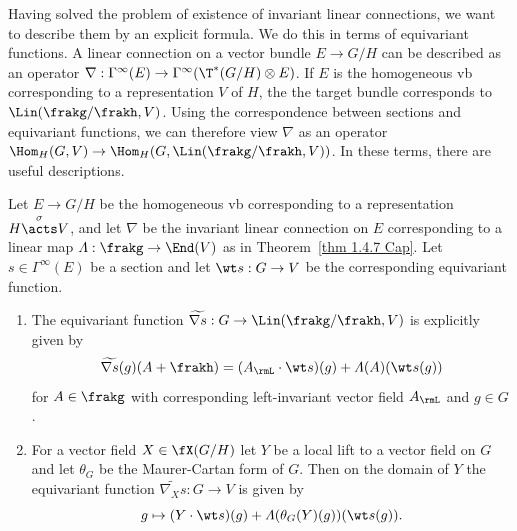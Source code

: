 Having solved the problem of existence of invariant linear connections, we want to describe them by an explicit formula. We do this in terms of equivariant functions. A linear connection on a vector bundle $E\to G\slash H$ can be described as an operator $\nabla:\Gamma^\infty(E)\to \Gamma^\infty(\T^\ast(G\slash H)\otimes E)$. If $E$ is the homogeneous \gls{vb} corresponding to a representation $V$ of $H$, the the target bundle corresponds to $\Lin(\frakg\slash\frakh,V)$. Using the correspondence between sections and equivariant functions, we can therefore view $\nabla$ as an operator $\Hom_H(G,V)\to \Hom_H(G,\Lin(\frakg\slash\frakh,V))$. In these terms, there are useful descriptions.

\begin{prop}\label{prop 1.4.7 Cap}
    Let $E\to G\slash H$ be the homogeneous \gls{vb} corresponding to a representation $H\overset{\sigma}{\acts}V$, and let $\nabla$ be the invariant linear connection on $E$ corresponding to a linear map $\varLambda:\frakg\to \End(V)$ as in Theorem~\ref{thm 1.4.7 Cap}. Let $s\in\Gamma^\infty(E)$ be a section and let $\wt s:G\to V$ be the corresponding equivariant function.

    \begin{enumerate}[label=(\arabic*)]
        \item The equivariant function $\widetilde{\nabla s}:G\to \Lin(\frakg\slash\frakh,V)$ is explicitly given by 
        \[\widetilde{\nabla s}(g)(A+\frakh)=(A_\rmL\cdot \wt s)(g)+\varLambda(A)(\wt s(g))\]
        for $A\in\frakg$ with corresponding left-invariant vector field $A_\rmL$ and $g\in G$.
        \item For a vector field $X\in\fX(G\slash H)$ let $Y$ be a local lift to a vector field on $G$ and let $\theta_G$ be the Maurer-Cartan form of $G$. Then on the domain of $Y$ the equivariant function $\widetilde{\nabla_X s}:G\to V$ is given by 
        \[g\mapsto (Y\cdot \wt s)(g)+\varLambda(\theta_G(Y)(g))(\wt s(g)).\]
    \end{enumerate}
\end{prop}
